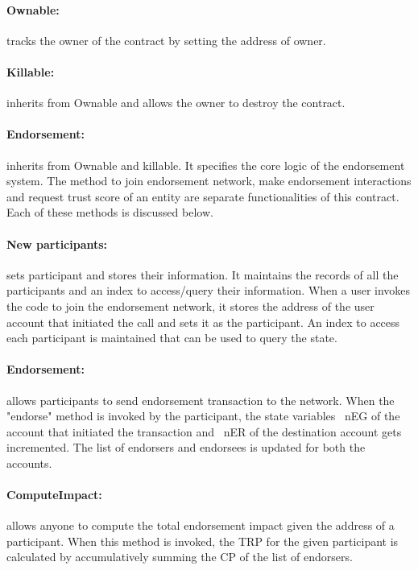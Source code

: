 \paragraph{Ownable:} tracks the owner of the contract by setting the address of
owner.
\paragraph{Killable:}inherits from Ownable and allows the owner to destroy the
contract.
\paragraph{Endorsement:}inherits from Ownable and killable. It specifies the
core logic of the endorsement system. The method to join endorsement network,
make endorsement interactions and request trust score of an entity are separate
functionalities of this contract. Each of these methods is discussed below. 
\paragraph{New participants:}sets participant and stores their information.
It maintains the records of all the participants and an index to access/query
their information. When a user invokes the code to join the endorsement
network, it stores the address of the user account that initiated the call and
sets it as the participant. An index to access each participant is maintained
that can be used to query the state. 
\paragraph{Endorsement:}allows participants to send endorsement transaction to
the network. When the "endorse" method is invoked by the participant, the state
variables ~\ac{nEG} of the account that initiated the transaction and ~\ac{nER}
of the destination account gets incremented. The list of endorsers and
endorsees is updated for both the accounts.
\paragraph{ComputeImpact:} allows anyone to compute the total endorsement
impact given the address of a participant. When this method is invoked, the
\ac{TRP} for the given participant is calculated by accumulatively summing the
\ac{CP} of the list of endorsers.  
